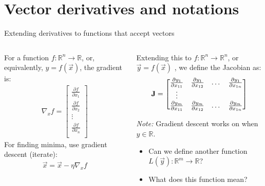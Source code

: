 \section{Vector derivatives and notations}
\begin{frame}{Extending derivatives to  functions that accept vectors}
	\begin{columns}[T]
		\begin{column}{.5\textwidth}
		For a function $f:\mathbb{R}^n \rightarrow \mathbb{R}$, 
			or, equivalently, $y=f(\vec{x})$, the gradient is:
			\begin{align}
			\nabla_x f = \begin{bmatrix}
			\frac{\partial f}{\partial x_1} \\
			\frac{\partial f}{\partial x_2} \\
			\vdots \\
			\frac{\partial f}{\partial x_n} \\
			\end{bmatrix}
			\end{align}
			For finding minima, use gradient descent (iterate):
			\begin{align}\label{eq:gradient.desc}
			\vec{x} =  \vec{x} - \eta \nabla_x f 
			\end{align}
		\end{column}
		\begin{column}{.5\textwidth}
			Extending this to  $f:\mathbb{R}^n \rightarrow \mathbb{R}^n$, 
			or $\vec{y}=f(\vec{x})$
			, we define the Jacobian as:
			\begin{align}
			{\bf J} = \begin{bmatrix}
			\frac{\partial y_1}{\partial x_{11}} & \frac{\partial y_1}{\partial x_{12}} & \dots & \frac{\partial y_1}{\partial x_{1n}}\\
			\vdots &  & & \\
			\frac{\partial y_m}{\partial x_{11}} & \frac{\partial y_m}{\partial x_{12}} & \dots & \frac{\partial y_m}{\partial x_{1n}} \\
			\end{bmatrix}
			\end{align}
			{\tiny
			{\it Note:}  Gradient descent works on when  $y\in \mathbb{R}$.
			\begin{itemize}
				\item Can we  define another function 	$L(\vec{y}):\mathbb{R}^m\rightarrow \mathbb{R}$?
				\item What does this function mean?
			\end{itemize} 
			}
		\end{column}
	\end{columns}
\end{frame}